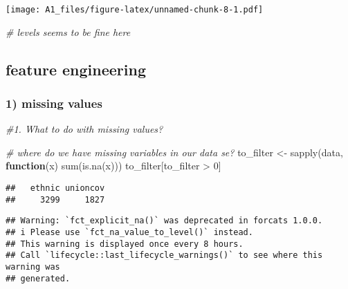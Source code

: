 \documentclass[
]{article}
\newenvironment{Shaded}{\begin{snugshade}}{\end{snugshade}}
\newcommand{\AttributeTok}[1]{\textcolor[rgb]{0.77,0.63,0.00}{#1}}
\newcommand{\CommentTok}[1]{\textcolor[rgb]{0.56,0.35,0.01}{\textit{#1}}}
\newcommand{\ControlFlowTok}[1]{\textcolor[rgb]{0.13,0.29,0.53}{\textbf{#1}}}
\newcommand{\DecValTok}[1]{\textcolor[rgb]{0.00,0.00,0.81}{#1}}
\newcommand{\FunctionTok}[1]{\textcolor[rgb]{0.00,0.00,0.00}{#1}}
\newcommand{\NormalTok}[1]{#1}
\newcommand{\OtherTok}[1]{\textcolor[rgb]{0.56,0.35,0.01}{#1}}
\newcommand{\SpecialCharTok}[1]{\textcolor[rgb]{0.00,0.00,0.00}{#1}}
\newcommand{\StringTok}[1]{\textcolor[rgb]{0.31,0.60,0.02}{#1}}
\begin{document}
\texttt{[image: A1\_files/figure-latex/unnamed-chunk-8-1.pdf]}

\begin{Shaded}
\begin{Highlighting}[]
\CommentTok{\# levels seems to be fine here }
\end{Highlighting}
\end{Shaded}

\hypertarget{feature-engineering}{%
\subsection{feature engineering}\label{feature-engineering}}

\hypertarget{missing-values}{%
\subsubsection{1) missing values}\label{missing-values}}

\begin{Shaded}
\begin{Highlighting}[]
\CommentTok{\#1. What to do with missing values? }

\CommentTok{\# where do we have missing variables in our data se?}
\NormalTok{to\_filter }\OtherTok{\textless{}{-}} \FunctionTok{sapply}\NormalTok{(data, }\ControlFlowTok{function}\NormalTok{(x) }\FunctionTok{sum}\NormalTok{(}\FunctionTok{is.na}\NormalTok{(x)))}
\NormalTok{to\_filter[to\_filter }\SpecialCharTok{\textgreater{}} \DecValTok{0}\NormalTok{]}
\end{Highlighting}
\end{Shaded}

\begin{verbatim}
##   ethnic unioncov 
##     3299     1827
\end{verbatim}

\begin{Shaded}
\end{Shaded}

\begin{verbatim}
## Warning: `fct_explicit_na()` was deprecated in forcats 1.0.0.
## i Please use `fct_na_value_to_level()` instead.
## This warning is displayed once every 8 hours.
## Call `lifecycle::last_lifecycle_warnings()` to see where this warning was
## generated.
\end{verbatim}
\end{document}
